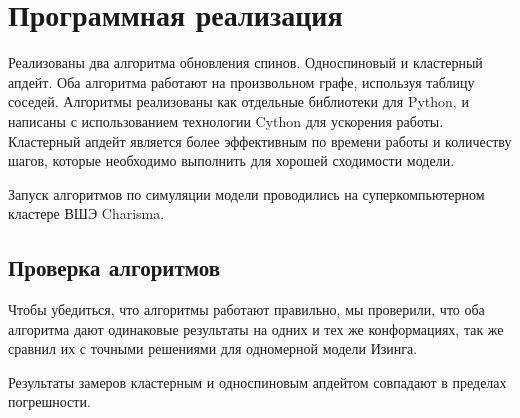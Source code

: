 \section{Программная реализация}

Реализованы два алгоритма обновления спинов. Односпиновый и кластерный апдейт. Оба алгоритма работают на произвольном графе, используя таблицу соседей. Алгоритмы реализованы как отдельные библиотеки для Python, и написаны с использованием технологии Cython для ускорения работы. Кластерный апдейт является более эффективным по времени работы и количеству шагов, которые необходимо выполнить для хорошей сходимости модели.

Запуск алгоритмов по симуляции модели проводились на суперкомпьютерном кластере ВШЭ Charisma. 

\subsection{Проверка алгоритмов}

Чтобы убедиться, что алгоритмы работают правильно, мы проверили, что оба алгоритма дают одинаковые результаты на одних и тех же конформациях, так же сравнил их с точными решениями для одномерной модели Изинга.

Результаты замеров кластерным и односпиновым апдейтом совпадают в пределах погрешности.

